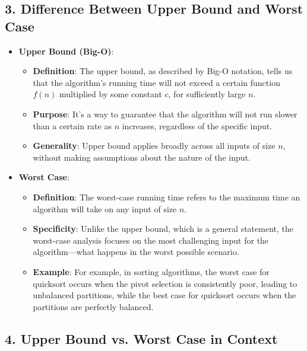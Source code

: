 \documentclass{article}
\begin{document}
\subsection*{3. Difference Between Upper Bound and Worst Case}

\begin{itemize}
    \item \textbf{Upper Bound (Big-O)}:
    \begin{itemize}
        \item \textbf{Definition}: The upper bound, as described by Big-O notation, tells us that the algorithm's running time will not exceed a certain function \(f(n)\) multiplied by some constant \(c\), for sufficiently large \(n\).
        \item \textbf{Purpose}: It's a way to guarantee that the algorithm will not run slower than a certain rate as \(n\) increases, regardless of the specific input.
        \item \textbf{Generality}: Upper bound applies broadly across all inputs of size \(n\), without making assumptions about the nature of the input.
    \end{itemize}

    \item \textbf{Worst Case}:
    \begin{itemize}
        \item \textbf{Definition}: The worst-case running time refers to the maximum time an algorithm will take on any input of size \(n\).
        \item \textbf{Specificity}: Unlike the upper bound, which is a general statement, the worst-case analysis focuses on the most challenging input for the algorithm—what happens in the worst possible scenario.
        \item \textbf{Example}: For example, in sorting algorithms, the worst case for quicksort occurs when the pivot selection is consistently poor, leading to unbalanced partitions, while the best case for quicksort occurs when the partitions are perfectly balanced.
    \end{itemize}
\end{itemize}

\subsection*{4. Upper Bound vs. Worst Case in Context}
\end{document}
